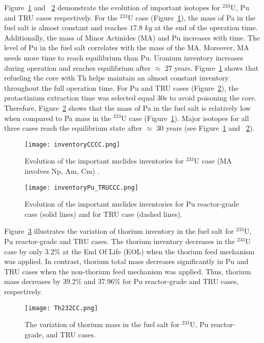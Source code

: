 Figure~\ref{fig:inventoryCCCC} and ~\ref{fig:inventoryPu_TRUCCC} demonstrate 
the evolution of important isotopes for $^{233}$U, Pu and TRU cases 
respectively. For the $^{233}$U case (Figure~\ref{fig:inventoryCCCC}), the mass of Pa in the fuel salt is almost constant and reaches 
$17.8$  $kg$ at the end of the operation time. 
Additionally, the mass of Minor Actinides (MA) and Pu increases with time. The level of Pu in the fuel salt correlates with the mass of the MA. Moreover, MA needs more time to reach equilibrium than Pu. Uranium inventory increases during 
operation and reaches equilibrium after $\approx$ $27$ years. Figure~\ref{fig:inventoryCCCC} shows that refueling the core with Th helps 
maintain an almost constant inventory throughout the full operation time. 
For Pu and TRU cases (Figure~\ref{fig:inventoryPu_TRUCCC}), the protactinium extraction time was selected equal 30s 
to avoid poisoning the core. Therefore, 
Figure~\ref{fig:inventoryPu_TRUCCC} shows that the mass of Pa in the fuel salt 
is relatively low when compared to Pa mass in the $^{233}$U case (Figure~\ref{fig:inventoryCCCC}). Major 
isotopes for all three cases reach the equilibrium state after $\approx$ $30$ 
years (see Figure~\ref{fig:inventoryCCCC} and ~\ref{fig:inventoryPu_TRUCCC}).
\begin{figure}
	\centering
	\texttt{[image: inventoryCCCC.png]}
	\vspace{-0.4in}
	\caption{Evolution of the important nuclides inventories for $^{233}$U 
		case (MA involves Np, Am, Cm) \cite{ashraf2019whole_core}.}
	\label{fig:inventoryCCCC}
\end{figure}
\begin{figure}
	\centering
	\texttt{[image: inventoryPu\_TRUCCC.png]}
	\vspace{-0.5in}
	\caption{Evolution of the important nuclides inventories for Pu 
		reactor-grade case (solid lines) and for TRU case (dashed lines).}
	\label{fig:inventoryPu_TRUCCC}
\end{figure}

Figure~\ref{fig:Th232CC} illustrates the variation of thorium inventory in the 
fuel salt for $^{233}$U, Pu reactor-grade and TRU cases. The thorium inventory 
decreases in the $^{233}$U case by only $3.2$\% at the End Of Life (EOL) when the thorium 
feed mechanism was applied. 
In contrast, thorium total mass decreases significantly in Pu and TRU cases when the non-thorium 
feed mechanism was applied. Thus, thorium mass decreases by $39.2$\% and 
$37.96$\% for Pu reactor-grade and TRU cases, respectively.
\begin{figure}
	\centering
	\texttt{[image: Th232CC.png]}
	\caption{The variation of thorium mass in the fuel salt for $^{233}$U, Pu reactor-grade, and TRU cases.}
	\label{fig:Th232CC}
\end{figure}

